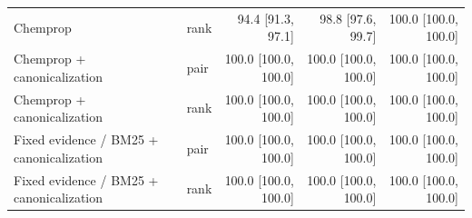 \begin{longtable}{p{.26\linewidth}lrrr}
Chemprop & rank & 94.4 [91.3, 97.1] & 98.8 [97.6, 99.7] & 100.0 [100.0, 100.0] \\
Chemprop + canonicalization & pair & 100.0 [100.0, 100.0] & 100.0 [100.0, 100.0] & 100.0 [100.0, 100.0] \\
Chemprop + canonicalization & rank & 100.0 [100.0, 100.0] & 100.0 [100.0, 100.0] & 100.0 [100.0, 100.0] \\
Fixed evidence / BM25 + canonicalization & pair & 100.0 [100.0, 100.0] & 100.0 [100.0, 100.0] & 100.0 [100.0, 100.0] \\
Fixed evidence / BM25 + canonicalization & rank & 100.0 [100.0, 100.0] & 100.0 [100.0, 100.0] & 100.0 [100.0, 100.0] \\
\bottomrule
\end{longtable}
\endgroup
